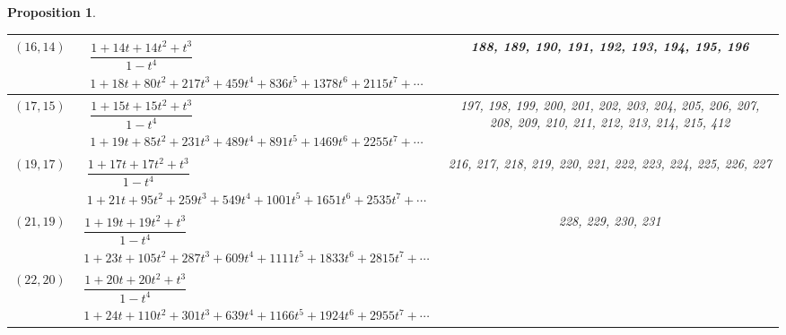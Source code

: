 \documentclass[10pt,a4paper]{amsart}
\newtheorem{prop}[thm]{Proposition}
\theoremstyle{definition}
\numberwithin{equation}{section}
\begin{document}
\begin{prop}
\begin{table}[h!]
\begin{tabu}{c|c|c}
	$(16,14)$\label{T(14,16)}
	&
	$\begin{array}{c}
	 \dfrac{1\!+\!14t\!+\!14t^2\!+\!t^3}{1-t^4} \\[3pt]
	 {1\!+\!18t\!+\!80t^2\!+\!217t^3\!+\!459t^4\!+\!836t^5\!+\!1378t^6\!+\!2115t^7\!+\!\cdots}
	\end{array}$
	&
	 \begin{minipage}{4cm}
 \rm
 	188, 189, 190, 191, 192, 193, 194, 195, 196
 \end{minipage}
	\\ \hline
	$(17,15)$\label{T(15,17)}
	&
	$\begin{array}{c}
	 \dfrac{1\!+\!15t\!+\!15t^2\!+\!t^3}{1-t^4} \\[3pt]
	 {1\!+\!19t\!+\!85t^2\!+\!231t^3\!+\!489t^4\!+\!891t^5\!+\!1469t^6\!+\!2255t^7\!+\!\cdots}
	\end{array}$
	&
	 \begin{minipage}{4cm}
 \rm
 	197, 198, 199, 200, 201, 202, 203, 204, 205, 206,
	 207, 208, 209, 210, 211, 212, 213, 214, 215, 412
 \end{minipage}
	\\ \hline
	$(19,17)$\label{T(17,19)}
	&
	$\begin{array}{c}
	 \dfrac{1\!+\!17t\!+\!17t^2\!+\!t^3}{1-t^4} \\[3pt]
	 {1\!+\!21t\!+\!95t^2\!+\!259t^3\!+\!549t^4\!+\!1001t^5\!+\!1651t^6\!+\!2535t^7\!+\!\cdots}
	\end{array}$
	&
	 \begin{minipage}{4cm}
 \rm
 	216, 217, 218, 219, 220, 221, 222, 223, 224, 225,
	 226, 227
 \end{minipage}
	\\ \hline
	$(21,19)$\label{T(19,21)}
	&
	$\begin{array}{c}
	 \dfrac{1\!+\!19t\!+\!19t^2\!+\!t^3}{1-t^4} \\[3pt]
	 {1\!+\!23t\!+\!105t^2\!+\!287t^3\!+\!609t^4\!+\!1111t^5\!+\!1833t^6\!+\!2815t^7\!+\!\cdots}
	\end{array}$
	&
	 \begin{minipage}{4cm}
 \rm
 	228, 229, 230, 231
 \end{minipage}
	\\ \hline
	$(22,20)$\label{T(20,22)}
	&
	$\begin{array}{c}
	 \dfrac{1\!+\!20t\!+\!20t^2\!+\!t^3}{1-t^4} \\[3pt]
	 {1\!+\!24t\!+\!110t^2\!+\!301t^3\!+\!639t^4\!+\!1166t^5\!+\!1924t^6\!+\!2955t^7\!+\!\cdots}
	\end{array}$
	&
	 \begin{minipage}{4cm}

\end{minipage}
\end{tabu}
\end{table}
\end{prop}
\end{document}
